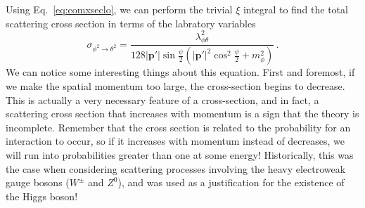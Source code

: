 \documentclass{article}
\numberwithin{equation}{subsection}
\begin{document}
Using Eq.~\eqref{eq:comxseclo}, we can perform the trivial $\xi$ integral to find the total scattering cross section in terms of the
labratory variables
\begin{equation}
	\sigma_{\phi^2\to\theta^2} = \frac{\lambda_{\phi\theta}^2}{128|\mathbf{p}'|\sin\frac{\psi}{2}(|\mathbf{p}'|^2\cos^2\frac{\psi}{2} + m_\phi^2)}\,.
\end{equation}
We can notice some interesting things about this equation. First and foremost, if we make the spatial momentum too large, the cross-section begins to decrease.  
This is actually a very necessary feature of a cross-section, and in fact, a scattering cross
section that increases with momentum is a sign that the theory is incomplete. Remember that the cross section is related to the probability for an interaction to occur, so
if it increases with momentum instead of decreases, we will run into probabilities greater than one at some energy! 
Historically, this was the case when considering scattering processes involving the heavy electroweak
gauge bosons ($W^\pm$ and $Z^0$), and was used as a justification for the existence of the Higgs boson!
\end{document}
